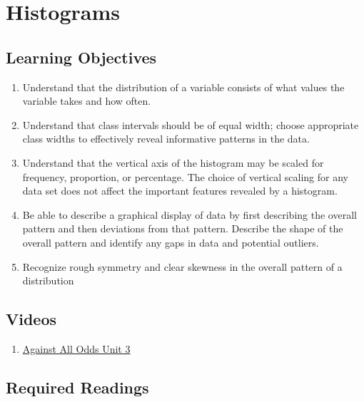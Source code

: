 \documentclass[letterpaper,9pt,twocolumn,twoside,printwatermark=false]{pinp}
\providecommand{\tightlist}{%
  \setlength{\itemsep}{0pt}\setlength{\parskip}{0pt}}
\begin{document}
\section{Histograms}\label{histograms}

\subsection{Learning Objectives}\label{learning-objectives}

\begin{enumerate}
\def\labelenumi{\arabic{enumi}.}
\tightlist
\item
  Understand that the distribution of a variable consists of what values
  the variable takes and how often.
\item
  Understand that class intervals should be of equal width; choose
  appropriate class widths to effectively reveal informative patterns in
  the data.
\item
  Understand that the vertical axis of the histogram may be scaled for
  frequency, proportion, or percentage. The choice of vertical scaling
  for any data set does not affect the important features revealed by a
  histogram.
\item
  Be able to describe a graphical display of data by first describing
  the overall pattern and then deviations from that pattern. Describe
  the shape of the overall pattern and identify any gaps in data and
  potential outliers.
\item
  Recognize rough symmetry and clear skewness in the overall pattern of
  a distribution
\end{enumerate}

\subsection{Videos}\label{videos}

\begin{enumerate}
\def\labelenumi{\arabic{enumi}.}
\tightlist
\item
  \href{https://www.learner.org/courses/againstallodds/unitpages/unit03.html}{Against
  All Odds Unit 3}
\end{enumerate}

\vspace*{0.25cm}

\subsection{Required Readings}\label{required-readings}
\end{document}
